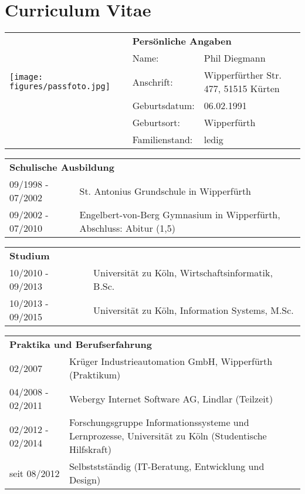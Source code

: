 \section*{\hspace{0.2cm}Curriculum Vitae} 

\begin{flushleft}

\begin{tabular}{p{11em} p{10em} p{10em}}
    \multirow{5}{*}{\texttt{[image: figures/passfoto.jpg]}} &     \multicolumn{2}{l}{\textbf{Persönliche Angaben}} \\
    & Name: & Phil Diegmann \\
    & Anschrift: & Wipperfürther Str. 477, 51515 Kürten \\
    & Geburtsdatum: & 06.02.1991 \\
    & Geburtsort: & Wipperfürth \\
    & Familienstand: & ledig \\
\end{tabular}

\vspace{0.5em}

\begin{tabular}{p{11em} p{22.5em}}
    \multicolumn{2}{l}{\textbf{Schulische Ausbildung}} \\
    09/1998 - 07/2002 & St. Antonius Grundschule in Wipperfürth \\
    09/2002 - 07/2010 & Engelbert-von-Berg Gymnasium in Wipperfürth, Abschluss: Abitur (1,5) \\
\end{tabular}

\vspace{0.5em}

\begin{tabular}{p{11em} p{22.5em}}
    \multicolumn{2}{l}{\textbf{Studium}} \\
    10/2010 - 09/2013 & Universität zu Köln, Wirtschaftsinformatik, B.Sc. \\
    10/2013 - 09/2015 & Universität zu Köln, Information Systems, M.Sc.\\
\end{tabular}

\vspace{0.5em}

\begin{tabular}{p{11em} p{22.5em}}
    \multicolumn{2}{l}{\textbf{Praktika und Berufserfahrung}} \\
    02/2007 & Krüger Industrieautomation GmbH, Wipperfürth (Praktikum) \\
    04/2008 - 02/2011 & Webergy Internet Software AG, Lindlar (Teilzeit) \\
    02/2012 - 02/2014 & Forschungsgruppe Informationssysteme und Lernprozesse, Universität zu Köln (Studentische Hilfskraft) \\
    seit 08/2012 & Selbststständig (IT-Beratung, Entwicklung und Design) \\
\end{tabular}


\end{flushleft}
